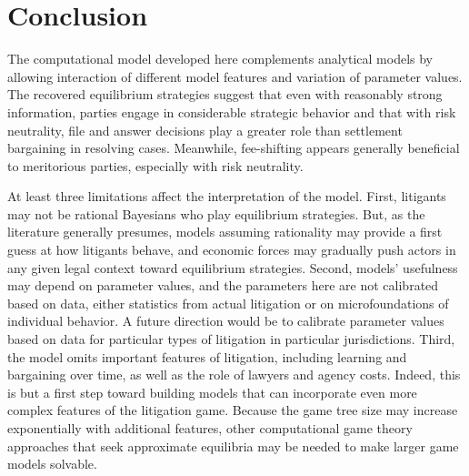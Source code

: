 \documentclass{article}
\begin{document}
\section{Conclusion}
\label{sec:conclusion}

The computational model developed here complements analytical models by allowing interaction of different model features and variation of parameter values. The recovered equilibrium strategies suggest that even with reasonably strong information, parties engage in considerable strategic behavior and that with risk neutrality, file and answer decisions play a greater role than settlement bargaining in resolving cases. Meanwhile, fee-shifting appears generally beneficial to meritorious parties, especially with risk neutrality.

At least three limitations affect the interpretation of the model. First, litigants may not be rational Bayesians who play equilibrium strategies. But, as the literature generally presumes, models assuming rationality may provide a first guess at how litigants behave, and economic forces may gradually push actors in any given legal context toward equilibrium strategies.  Second, models' usefulness may depend on parameter values, and the parameters here are not calibrated based on data, either statistics from actual litigation or on microfoundations of individual behavior. A future direction would be to calibrate parameter values based on data for particular types of litigation in particular jurisdictions. Third, the model omits important features of litigation, including learning and bargaining over time, as well as the role of lawyers and agency costs. Indeed, this is but a first step toward building models that can incorporate even more complex features of the litigation game. Because the game tree size may increase exponentially with additional features, other computational game theory approaches that seek approximate equilibria may be needed to make larger game models solvable.

\begingroup
\singlespacing
\small
\setlength{\bibitemsep}{0pt}
\printbibliography
\endgroup
\end{document}
